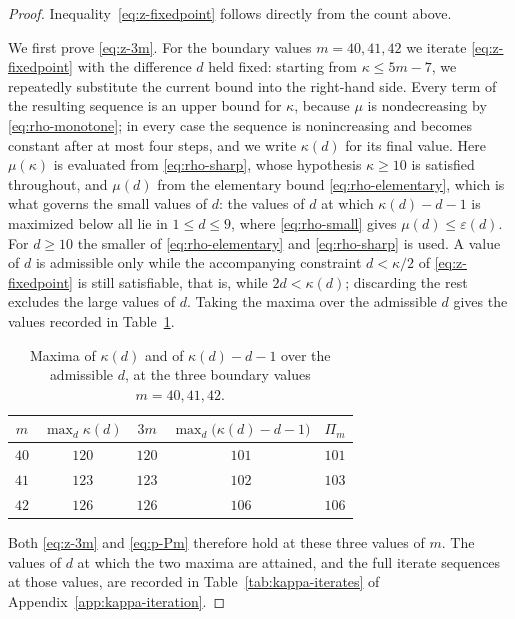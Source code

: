 \documentclass[11pt]{article}
\theoremstyle{definition}
\theoremstyle{remark}
\numberwithin{equation}{section}
\begin{document}
\begin{proof}
Inequality~\eqref{eq:z-fixedpoint} follows directly from the count above.

We first prove \eqref{eq:z-3m}. For the boundary values $m=40,41,42$ we iterate
\eqref{eq:z-fixedpoint} with the difference $d$ held fixed: starting from
$\kappa\le5m-7$, we repeatedly substitute the current bound into the
right-hand side. Every term of the resulting sequence is an upper bound for
$\kappa$, because $\mu$ is nondecreasing by \eqref{eq:rho-monotone}; in every
case the sequence is nonincreasing and becomes constant after at most four
steps, and we write $\kappa(d)$ for its final value. Here $\mu(\kappa)$ is evaluated from
\eqref{eq:rho-sharp}, whose hypothesis $\kappa\ge10$ is satisfied throughout, and
$\mu(d)$ from the elementary bound \eqref{eq:rho-elementary}, which is what
governs the small values of $d$: the values of $d$ at which $\kappa(d)-d-1$ is
maximized below all lie in $1\le d\le9$, where \eqref{eq:rho-small} gives
$\mu(d)\le\varepsilon(d)$. For $d\ge10$ the
smaller of \eqref{eq:rho-elementary} and \eqref{eq:rho-sharp} is used. A value of
$d$ is admissible only while the accompanying
constraint $d<\kappa/2$ of \eqref{eq:z-fixedpoint} is still satisfiable, that is,
while $2d<\kappa(d)$; discarding the rest excludes the large values of $d$.
Taking the maxima over the admissible $d$ gives the values recorded in
Table~\ref{tab:kappa-maxima}.

\begin{table}[ht]
\centering
\caption{Maxima of $\kappa(d)$ and of $\kappa(d)-d-1$ over the admissible
$d$, at the three boundary values $m=40,41,42$.}\label{tab:kappa-maxima}
\begin{tabular}{ccccc}
\toprule
$m$ & $\max_d\kappa(d)$ & $3m$ & $\max_d\bigl(\kappa(d)-d-1\bigr)$ & $\Pi_m$\\
\midrule
$40$ & $120$ & $120$ & $101$ & $101$\\
$41$ & $123$ & $123$ & $102$ & $103$\\
$42$ & $126$ & $126$ & $106$ & $106$\\
\bottomrule
\end{tabular}
\end{table}

Both \eqref{eq:z-3m} and \eqref{eq:p-Pm} therefore hold at these three values
of $m$. The values of $d$ at which the two maxima are attained, and the full
iterate sequences at those values, are recorded in
Table~\ref{tab:kappa-iterates} of Appendix~\ref{app:kappa-iteration}.


\end{proof}
\end{document}
